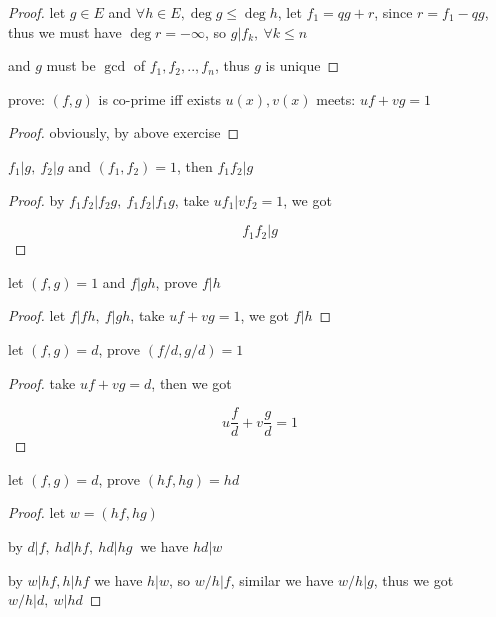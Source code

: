 \begin{proof}
    let $g \in E$ and  $\forall h \in E, \deg g \le \deg h$, let $f_1 = qg + r$, since $r = f_1 -qg$,
    thus we must have $\deg r = -\infty$, so $g | f_k,\: \forall k \le n$

    and $g$ must be $\gcd$ of $f_1,f_2,..,f_n$, thus $g$ is unique
\end{proof}

\begin{exercise}
    prove: $(f,g)$ is co-prime iff exists $u(x), v(x)$ meets: $uf + vg = 1$
\end{exercise}

\begin{proof}
    obviously, by above exercise
\end{proof}

\begin{exercise}
    $f_1 | g,\: f_2 | g$ and $(f_1,f_2) = 1$,
    then $f_1f_2 | g$

\end{exercise}

\begin{proof}
    by $f_1f_2 | f_2g,\: f_1f_2 | f_1g$, take $uf_1 | vf_2 = 1$, we got

    \[
        f_1f_2 | g
    \]
\end{proof}

\begin{exercise}
    let $(f,g)= 1$ and $f | gh$, prove $f | h$
\end{exercise}

\begin{proof}
    let $f | fh, \: f|gh$, take $uf + vg = 1$, we got $f | h$
\end{proof}

\begin{exercise}
    let $(f,g) = d$, prove $(f/d, g/d) = 1$
\end{exercise}

\begin{proof}
    take $uf + vg = d$, then we got

    \[
        u\frac{f}{d} + v \frac{g}{d} = 1
    \]
\end{proof}

\begin{exercise}
    let $(f,g) =d$, prove $(hf,hg) = hd$
\end{exercise}

\begin{proof}
    let $w = (hf, hg)$

    by $d | f,\: hd | hf,\: hd | hg\:$ we have $hd | w$

    by $w | hf, h | hf$ we have $h | w$, so $w/h | f$, similar we have $w/h | g$,  
    thus we got $w/h | d,\: w | hd$
\end{proof}


